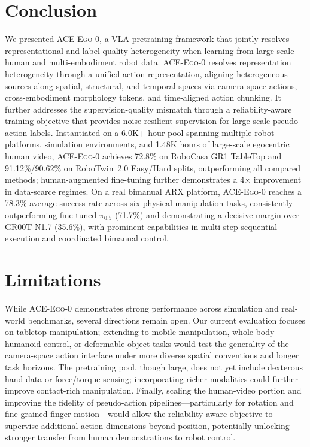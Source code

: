 \documentclass{article}
\newcommand{\OURS}{\textsc{ACE-Ego-0}\xspace}
\newcommand{\Ours}{\OURS}
\begin{document}
\section{Conclusion}
\label{sec:conclusion}
We presented \Ours, a VLA pretraining framework that jointly resolves representational and label-quality heterogeneity when learning from large-scale human and multi-embodiment robot data.
\Ours resolves representation heterogeneity through a unified action representation, aligning heterogeneous sources along spatial, structural, and temporal spaces via camera-space actions, cross-embodiment morphology tokens, and time-aligned action chunking. It further addresses the supervision-quality mismatch through a reliability-aware training objective that provides noise-resilient supervision for large-scale pseudo-action labels.
Instantiated on a 6.0K+ hour pool spanning multiple robot platforms, simulation environments, and 1.48K hours of large-scale egocentric human video, \Ours achieves 72.8\% on RoboCasa GR1 TableTop and 91.12\%/90.62\% on RoboTwin~2.0 Easy/Hard splits, outperforming all compared methods; human-augmented fine-tuning further demonstrates a 4$\times$ improvement in data-scarce regimes.
On a real bimanual ARX platform, \Ours reaches a 78.3\% average success rate across six physical manipulation tasks, consistently outperforming fine-tuned $\pi_{0.5}$ (71.7\%) and demonstrating a decisive margin over GR00T-N1.7 (35.6\%), with prominent capabilities in multi-step sequential execution and coordinated bimanual control.

\section{Limitations} 
While \Ours demonstrates strong performance across simulation and real-world benchmarks, several directions remain open. Our current evaluation focuses on tabletop manipulation; extending to mobile manipulation, whole-body humanoid control, or deformable-object tasks would test the generality of the camera-space action interface under more diverse spatial conventions and longer task horizons. The pretraining pool, though large, does not yet include dexterous hand data or force/torque sensing; incorporating richer modalities could further improve contact-rich manipulation. Finally, scaling the human-video portion and improving the fidelity of pseudo-action pipelines---particularly for rotation and fine-grained finger motion---would allow the reliability-aware objective to supervise additional action dimensions beyond position, potentially unlocking stronger transfer from human demonstrations to robot control.
\end{document}
